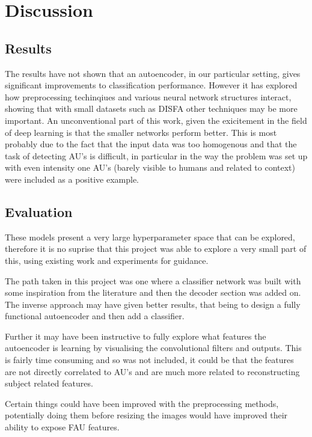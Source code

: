 \chapter{Discussion}
  \section{Results}
    The results have not shown that an autoencoder, in our particular setting,
    gives significant improvements to classification performance. However it has
    explored how preprocessing techinqiues and various neural network structures
    interact, showing that with small datasets such as DISFA other techniques may
    be more important. An unconventional part of this work, given the exicitement
    in the field of deep learning is that the smaller networks perform better.
    This is most probably due to the fact that the input data was too homogenous
    and that the task of detecting AU's is difficult, in particular in the way the problem was set up
    with even intensity one AU's (barely visible to humans and related to context)
    were included as a positive example.

  \section{Evaluation}
    These models present a very large hyperparameter space that can be explored, therefore
    it is no suprise that this project was able to explore a very small part of this, using
    existing work and experiments for guidance.

    The path taken in this project was one where a classifier network was built
    with some inspiration from the literature and then the decoder section was added on.
    The inverse approach may have given better results, that being to design a fully functional
    autoencoder and then add a classifier.

    Further it may have been instructive to fully explore what features the autoencoder is learning
    by visualising the convolutional filters and outputs. This is fairly time consuming and
    so was not included, it could be that the features are not directly correlated to AU's and
    are much more related to reconstructing subject related features.

    Certain things could have been improved with the preprocessing methods,
    potentially doing them before resizing the images would have improved their
    ability to expose FAU features.

